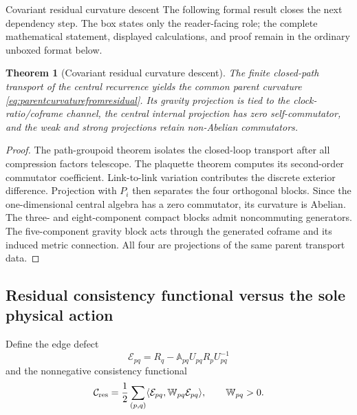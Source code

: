 \documentclass[11pt]{article}
\numberwithin{equation}{section}
\newtheorem{theorem}[definition]{Theorem}
\theoremstyle{remark}
\begin{document}
\begin{proofguide}{Covariant residual curvature descent}
The following formal result closes the next dependency step. The box states only the reader-facing role; the complete mathematical statement, displayed calculations, and proof remain in the ordinary unboxed format below.
\end{proofguide}
\begin{theorem}[Covariant residual curvature descent]
The finite closed-path transport of the central recurrence yields the common parent curvature \eqref{eq:parentcurvaturefromresidual}.  Its gravity projection is tied to the clock-ratio/coframe channel, the central internal projection has zero self-commutator, and the weak and strong projections retain non-Abelian commutators.
\end{theorem}
\begin{proof}
The path-groupoid theorem isolates the closed-loop transport after all compression factors telescope.  The plaquette theorem computes its second-order commutator coefficient.  Link-to-link variation contributes the discrete exterior difference.  Projection with $P_i$ then separates the four orthogonal blocks.  Since the one-dimensional central algebra has a zero commutator, its curvature is Abelian.  The three- and eight-component compact blocks admit noncommuting generators.  The five-component gravity block acts through the generated coframe and its induced metric connection.  All four are projections of the same parent transport data.
\end{proof}

\subsection{Residual consistency functional versus the sole physical action}
Define the edge defect
\begin{equation}
\mathcal E_{pq}=R_q-\mathbb A_{pq}U_{pq}R_pU_{pq}^{-1}
\label{eq:residualdefect}
\end{equation}
and the nonnegative consistency functional
\begin{equation}
\mathcal C_{\rm res}=\frac12\sum_{(p,q)}\langle\mathcal E_{pq},\mathbb W_{pq}\mathcal E_{pq}\rangle,
\qquad \mathbb W_{pq}>0.
\label{eq:residualconsistency}
\end{equation}
\end{document}
